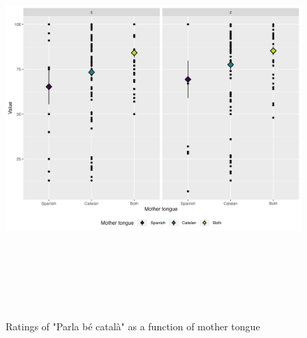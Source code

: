 \documentclass[
  a4paper,
  11pt,
  twocolumn]{article}
\begin{document}
\begin{figure}[!ht]
\begin{center}
\includegraphics[height=15cm]{./includes/figures/pbc.png}
\caption{Ratings of "Parla bé català" as a function of mother tongue}\label{fig:pbc}
\end{center}
\end{figure}
\end{document}
